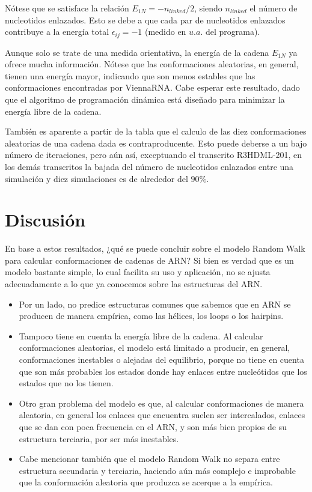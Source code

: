 \documentclass[a4paper,11pt,titlepage]{article}
\theoremstyle{definition}
\begin{document}
Nótese que se satisface la relación $E_{1N} = - n_{linked} / 2$, siendo $n_{linked}$ el número de nucleotidos enlazados. Esto se debe a que cada par de nucleotidos enlazados contribuye a la energía total $\epsilon_{ij} = -1$ (medido en $u.a.$ del programa). 

Aunque solo se trate de una medida orientativa, la energía de la cadena $E_{1N}$ ya ofrece mucha información. Nótese que las conformaciones aleatorias, en general, tienen una energía mayor, indicando que son menos estables que las conformaciones encontradas por ViennaRNA. Cabe esperar este resultado, dado que el algoritmo de programación dinámica está diseñado para minimizar la energía libre de la cadena.

También es aparente a partir de la tabla que el calculo de las diez conformaciones aleatorias de una cadena dada es contraproducente. Esto puede deberse a un bajo número de iteraciones, pero aún así, exceptuando el transcrito R3HDML-201, en los demás transcritos la bajada del número de nucleotidos enlazados entre una simulación y diez simulaciones es de alrededor del $90\%$. 

\newpage
\section{Discusión}\label{sec:cnc}

En base a estos resultados, ¿qué se puede concluir sobre el modelo Random Walk para calcular conformaciones de cadenas de ARN? Si bien es verdad que es un modelo bastante simple, lo cual facilita su uso y aplicación, no se ajusta adecuadamente a lo que ya conocemos sobre las estructuras del ARN.

\begin{itemize}
    \item Por un lado, no predice estructuras comunes que sabemos que en ARN se producen de manera empírica, como las hélices, los loops o los hairpins.
    \item Tampoco tiene en cuenta la energía libre de la cadena. Al calcular conformaciones aleatorias, el modelo está limitado a producir, en general, conformaciones inestables o alejadas del equilibrio, porque no tiene en cuenta que son más probables los estados donde hay enlaces entre nucleótidos que los estados que no los tienen.
    \item Otro gran problema del modelo es que, al calcular conformaciones de manera aleatoria, en general los enlaces que encuentra suelen ser intercalados, enlaces que se dan con poca frecuencia en el ARN, y son más bien propios de su estructura terciaria, por ser más inestables.
    \item Cabe mencionar también que el modelo Random Walk no separa entre estructura secundaria y terciaria, haciendo aún más complejo e improbable que la conformación aleatoria que produzca se acerque a la empírica.
\end{itemize}
\end{document}
